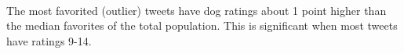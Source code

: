 \documentclass[11pt]{article}
\begin{document}
    \begin{center}
    \end{center}
    { \hspace*{\fill} \\}
    
    The most favorited (outlier) tweets have dog ratings about 1 point
higher than the median favorites of the total population. This is
significant when most tweets have ratings 9-14.


    
    
    
    
\end{document}
